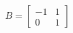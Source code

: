 \documentclass[preview]{standalone}
\begin{document}
\begin{align*}
B = \begin{bmatrix} -1 & 1 \\ 0 & 1 \end{bmatrix}
\end{align*}
\end{document}

